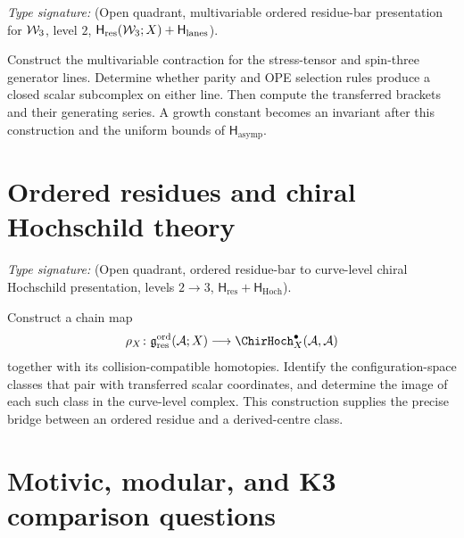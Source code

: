 \begin{problem}
\ClaimStatusOpen
\label{def:w3-wline-integer-sequence}
\label{thm:w3-wline-closed-form}
\label{thm:w3-wline-exponential-base}
\label{thm:w3-wline-generating-function}
\label{cor:w3-wline-self-consistency}
\label{prop:W3-T-line-matches-Vir-subleading}
\label{rem:w3-wline-doubling-interpretation}
\label{rem:w3-wline-higher-spin-prediction}
\label{rem:w3-wline-koszul-duality-partner}
\emph{Type signature:}
\textup{(Open quadrant, multivariable ordered residue-bar
presentation for \(\mathcal W_3\), level \(2\),
\(\mathsf H_{\mathrm{res}}(\mathcal W_3;X)+\mathsf H_{\mathrm{lanes}}\)).}

Construct the multivariable contraction for the stress-tensor and
spin-three generator lines.  Determine whether parity and OPE
selection rules produce a closed scalar subcomplex on either line.
Then compute the transferred brackets and their generating series.
A growth constant becomes an invariant after this construction and
the uniform bounds of $\mathsf H_{\mathrm{asymp}}$.
\end{problem}

\section{Ordered residues and chiral Hochschild theory}
\label{sec:shadow-chirhoch-bridge}

\begin{problem}
\ClaimStatusOpen
\label{def:universal-arnold-cycle}
\label{thm:shadow-chirhoch-dictionary}
\label{cor:chirhoch-depth-forces-shadow-depth}
\emph{Type signature:}
\textup{(Open quadrant, ordered residue-bar to curve-level chiral
Hochschild presentation, levels \(2\to3\),
\(\mathsf H_{\mathrm{res}}+\mathsf H_{\mathrm{Hoch}}\)).}

Construct a chain map
\[
  \rho_X\colon
  \mathfrak g_{\mathrm{res}}^{\mathrm{ord}}(\cA;X)
  \longrightarrow
  \ChirHoch_X^\bullet(\cA,\cA)
\]
together with its collision-compatible homotopies.  Identify the
configuration-space classes that pair with transferred scalar
coordinates, and determine the image of each such class in the
curve-level complex.  This construction supplies the precise bridge
between an ordered residue and a derived-centre class.
\end{problem}

\section{Motivic, modular, and K3 comparison questions}
\label{sec:shadtower-supplement}
\label{sec:shadtower-phi-n-weight-11-12-13}
\label{sec:shadtower-phi-n-weight-13-14-15-16}
\label{sec:shadtower-phi-n-weight-17-18-19-20}
\label{sec:shadtower-phi-n-weight-21-22-23-24}
\label{sec:shadtower-phi-n-weight-25-26-27-28}
\label{sec:shadtower-phi-n-weight-29-30-31-32}
\label{sec:shadtower-phi-n-weight-33-36}
\label{sec:shadtower-phi-n-humbert-heegner-admissible-triple}
\label{sec:phi-n-humbert-heegner-triple-37-43-45}

